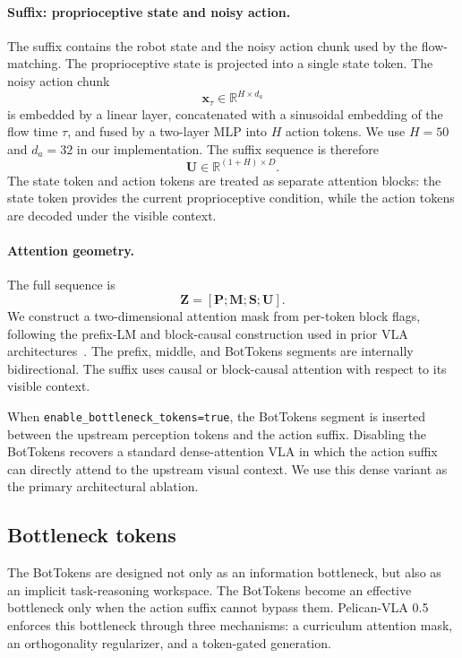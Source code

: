 \documentclass[a4paper,table]{extarticle}
\begin{document}
\paragraph{Suffix: proprioceptive state and noisy action.}
The suffix contains the robot state and the noisy action chunk used by the flow-matching. The proprioceptive state is projected into a single state token. The noisy action chunk
\begin{equation}
\mathbf x_\tau \in \mathbb{R}^{H \times d_a}
\end{equation}
is embedded by a linear layer, concatenated with a sinusoidal embedding of the flow time $\tau$, and fused by a two-layer MLP into $H$ action tokens. We use $H=50$ and $d_a=32$ in our implementation. The suffix sequence is therefore
\begin{equation}
\mathbf U \in \mathbb{R}^{(1+H)\times D}.
\end{equation}
The state token and action tokens are treated as separate attention blocks: the state token provides the current proprioceptive condition, while the action tokens are decoded under the visible context.

\paragraph{Attention geometry.}
The full sequence is
\begin{equation}
\mathbf Z = [\mathbf P;\mathbf M;\mathbf S;\mathbf U].
\end{equation}
We construct a two-dimensional attention mask from per-token block flags, following the prefix-LM and block-causal construction used in prior VLA architectures~\cite{pi0_2026}. The prefix, middle, and BotTokens segments are internally bidirectional. The suffix uses causal or block-causal attention with respect to its visible context. 

When \verb|enable_bottleneck_tokens=true|, the BotTokens segment is inserted between the upstream perception tokens and the action suffix. Disabling the BotTokens recovers a standard dense-attention VLA in which the action suffix can directly attend to the upstream visual context. We use this dense variant as the primary architectural ablation.


\subsection{Bottleneck tokens}
\label{sec:method:slots}
The BotTokens are designed not only as an information bottleneck, but also as an implicit task-reasoning workspace. The BotTokens become an effective bottleneck only when the action suffix cannot bypass them. Pelican-VLA 0.5 enforces this bottleneck through three mechanisms: a curriculum attention mask, an orthogonality regularizer, and a token-gated generation.
\end{document}
